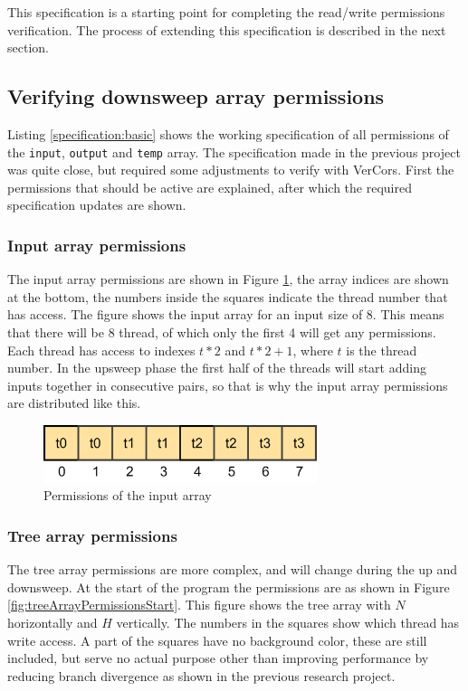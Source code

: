 \documentclass[a4paper]{article}
\newcommand{\code}[1]{\texttt{\small \color{inline}#1}} %
\begin{document}
This specification is a starting point for completing the read/write permissions verification. The process of extending this specification is described in the next section.



\subsection{Verifying downsweep array permissions}
Listing \ref{specification:basic} shows the working specification of all permissions of the \code{input}, \code{output} and \code{temp} array. The specification made in the previous project was quite close, but required some adjustments to verify with VerCors. First the permissions that should be active are explained, after which the required specification updates are shown.

\subsubsection{Input array permissions}
The input array permissions are shown in Figure \ref{fig:inputArrayPermissions}, the array indices are shown at the bottom, the numbers inside the squares indicate the thread number that has access. The figure shows the input array for an input size of 8. This means that there will be 8 thread, of which only the first 4 will get any permissions. Each thread has access to indexes $t*2$ and $t*2+1$, where $t$ is the thread number. In the upsweep phase the first half of the threads will start adding inputs together in consecutive pairs, so that is why the input array permissions are distributed like this.

\begin{figure}[htb!]
	\centering
	\includegraphics[width=80mm]{../images/input-permissions-v1.png}
	\caption{Permissions of the input array}
	\label{fig:inputArrayPermissions}
\end{figure}
\FloatBarrier

\subsubsection{Tree array permissions}
The tree array permissions are more complex, and will change during the up and downsweep. At the start of the program the permissions are as shown in Figure \ref{fig:treeArrayPermissionsStart}. This figure shows the tree array with $N$ horizontally and $H$ vertically. The numbers in the squares show which thread has write access. A part of the squares have no background color, these are still included, but serve no actual purpose other than improving performance by reducing branch divergence as shown in the previous research project.
\end{document}

